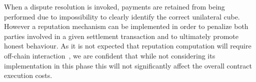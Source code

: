 \documentclass[chi_draft]{sigchi}
\begin{document}

When a dispute resolution is invoked, payments are retained from being performed due to impossibility to clearly identify the correct unilateral cube. However a reputation mechanism can be implemented in order to penalize both parties involved in a given settlement transaction and to ultimately promote honest behaviour. As it is not expected that reputation computation will require off-chain interaction~\cite{schaub2016trustless,carboni2015feedback}, we are confident that while not considering its implementation in this phase this will not significantly affect the overall contract execution costs.
\end{document}
